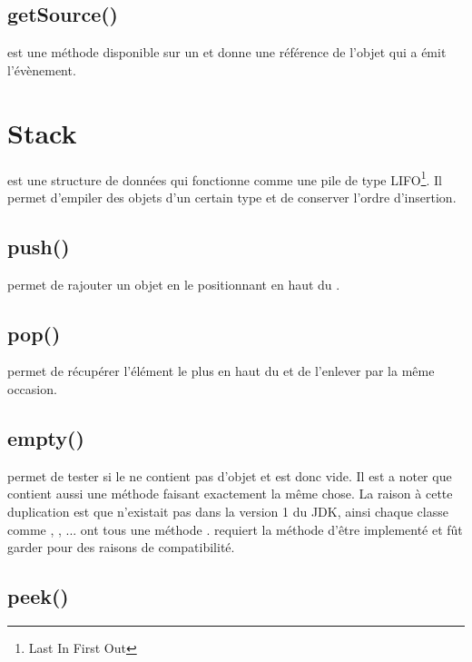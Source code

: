 \subsection{getSource()}

 est une méthode disponible sur un  et donne une référence de l'objet qui a émit l'évènement.

\section{Stack}

 est une structure de données qui fonctionne comme une pile de type LIFO\footnote{Last In First Out}. Il permet d'empiler des objets d'un certain type et de conserver l'ordre d'insertion.

\subsection{push()}

 permet de rajouter un objet en le positionnant en haut du .

\subsection{pop()}

 permet de récupérer l'élément le plus en haut du  et de l'enlever par la même occasion.

\subsection{empty()}

 permet de tester si le  ne contient pas d'objet et est donc vide. Il est a noter que  contient aussi une méthode  faisant exactement la même chose. La raison à cette duplication est que  n'existait pas dans la version 1 du JDK, ainsi chaque classe comme , , ... ont tous une méthode .  requiert la méthode  d'être implementé et  fût garder pour des raisons de compatibilité.

\subsection{peek()}

